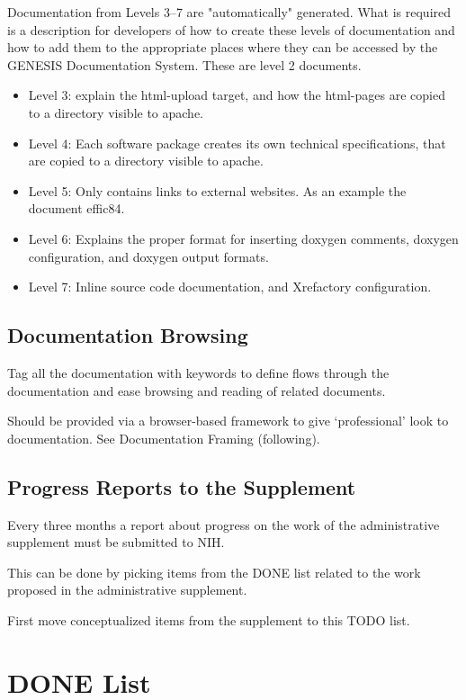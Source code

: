 \documentclass[12pt]{article}
\begin{document}
Documentation from Levels 3--7 are "automatically" generated. What is
required is a description for developers of how to create these levels
of documentation and how to add them to the appropriate places where
they can be accessed by the GENESIS Documentation System.  These are
level 2 documents.

\begin{itemize}
\item Level 3: explain the html-upload target, and how the html-pages
  are copied to a directory visible to apache.
\item Level 4: Each software package creates its own technical
  specifications, that are copied to a directory visible to apache.
\item Level 5: Only contains links to external websites.  As an
  example the document effic84.
\item Level 6: Explains the proper format for inserting doxygen comments,
 doxygen configuration, and doxygen output formats.
\item Level 7: Inline source code documentation, and Xrefactory configuration. 
\end{itemize}

\subsection{Documentation Browsing}

Tag all the documentation with keywords to define flows through the
documentation and ease browsing and reading of related documents.

Should be provided via a browser-based framework to give
`professional' look to documentation. See Documentation Framing
(following).


\subsection{Progress Reports to the Supplement}

Every three months a report about progress on the work of the
administrative supplement must be submitted to NIH.

This can be done by picking items from the DONE list related to the
work proposed in the administrative supplement.

First move conceptualized items from the supplement to this TODO list.


\section{DONE List}
\end{document}
